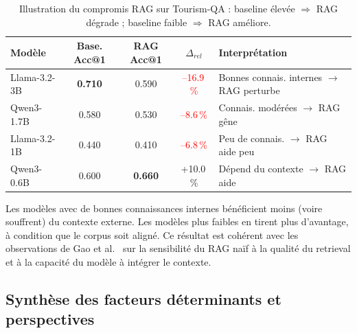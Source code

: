 \documentclass[12pt,a4paper]{article}
\begin{document}
\begin{table}[H]
\centering
\caption{Illustration du compromis RAG sur Tourism-QA : baseline \'elev\'ee
  $\Rightarrow$ RAG d\'egrade ; baseline faible $\Rightarrow$ RAG am\'eliore.}
\label{tab:rag_paradox}
\begin{tabular}{@{} l c c c l @{}}
\toprule
\textbf{Mod\`ele} & \textbf{Base. Acc@1} & \textbf{RAG Acc@1}
  & \textbf{$\Delta_{rel}$} & \textbf{Interpr\'etation} \\
\midrule
Llama-3.2-3B & \textbf{0.710} & 0.590
  & \textcolor{red}{--16.9\,\%}
  & Bonnes connais. internes $\to$ RAG perturbe \\
\rowcolor{lightgray}
Qwen3-1.7B   & 0.580 & 0.530
  & \textcolor{red}{--8.6\,\%}
  & Connais. mod\'er\'ees $\to$ RAG g\^ene \\
Llama-3.2-1B & 0.440 & 0.410
  & \textcolor{red}{--6.8\,\%}
  & Peu de connais. $\to$ RAG aide peu \\
\rowcolor{lightgray}
Qwen3-0.6B   & 0.600 & \textbf{0.660}
  & \textcolor{green!60!black}{+10.0\,\%}
  & D\'epend du contexte $\to$ RAG aide \\
\bottomrule
\end{tabular}
\end{table}

Les mod\`eles avec de bonnes connaissances internes b\'en\'eficient moins (voire souffrent)
du contexte externe. Les mod\`eles plus faibles en tirent plus d'avantage, \`a condition
que le corpus soit align\'e. Ce r\'esultat est coh\'erent avec les observations de
Gao et al.~\cite{gao2023ragsurvey} sur la sensibilit\'e du RAG na\"if \`a la qualit\'e
du retrieval et \`a la capacit\'e du mod\`ele \`a int\'egrer le contexte.

\subsection{Synth\`ese des facteurs d\'eterminants et perspectives}
\end{document}
